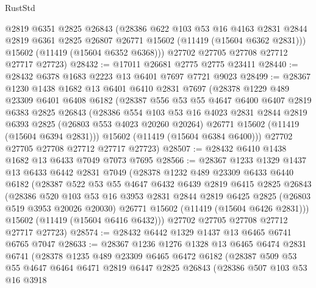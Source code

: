 \begin{lexlean}{RustStd}
\begin{coremodule}
        @2819
        @6351
        @2825
        @26843
        (@28386
          @622
          @103
          @53
          @16
          @4163
          @2831
          @2844
          @2819
          @6361
          @2825
          @26807
          @26771
          @15602
          (@11419 (@15604 @6362 @2831)))
        @15602
        (@11419 (@15604 @6352 @6368)))
      @27702
      @27705
      @27708
      @27712
      @27717
      @27723)
@28432 := @17011 @26681 @2775 @2775 @23411
@28440 := @28432 @6378 @1683 @2223 @13 @6401 @7697 @7721 @9023
@28499 := @28367
    @1230
    @1438
    @1682
    @13
    @6401
    @6410
    @2831
    @7697
    (@28378
      @1229
      @489
      @23309
      @6401
      @6408
      @6182
      (@28387
        @556
        @53
        @55
        @4647
        @6400
        @6407
        @2819
        @6383
        @2825
        @26843
        (@28386
          @554
          @103
          @53
          @16
          @4023
          @2831
          @2844
          @2819
          @6393
          @2825
          (@26803 @553 @4023 @20260 @20264)
          @26771
          @15602
          (@11419 (@15604 @6394 @2831)))
        @15602
        (@11419 (@15604 @6384 @6400)))
      @27702
      @27705
      @27708
      @27712
      @27717
      @27723)
@28507 := @28432 @6410 @1438 @1682 @13 @6433 @7049 @7073 @7695
@28566 := @28367
    @1233
    @1329
    @1437
    @13
    @6433
    @6442
    @2831
    @7049
    (@28378
      @1232
      @489
      @23309
      @6433
      @6440
      @6182
      (@28387
        @522
        @53
        @55
        @4647
        @6432
        @6439
        @2819
        @6415
        @2825
        @26843
        (@28386
          @520
          @103
          @53
          @16
          @3953
          @2831
          @2844
          @2819
          @6425
          @2825
          (@26803 @519 @3953 @20026 @20030)
          @26771
          @15602
          (@11419 (@15604 @6426 @2831)))
        @15602
        (@11419 (@15604 @6416 @6432)))
      @27702
      @27705
      @27708
      @27712
      @27717
      @27723)
@28574 := @28432 @6442 @1329 @1437 @13 @6465 @6741 @6765 @7047
@28633 := @28367
    @1236
    @1276
    @1328
    @13
    @6465
    @6474
    @2831
    @6741
    (@28378
      @1235
      @489
      @23309
      @6465
      @6472
      @6182
      (@28387
        @509
        @53
        @55
        @4647
        @6464
        @6471
        @2819
        @6447
        @2825
        @26843
        (@28386
          @507
          @103
          @53
          @16
          @3918

\end{coremodule}
\end{lexlean}
